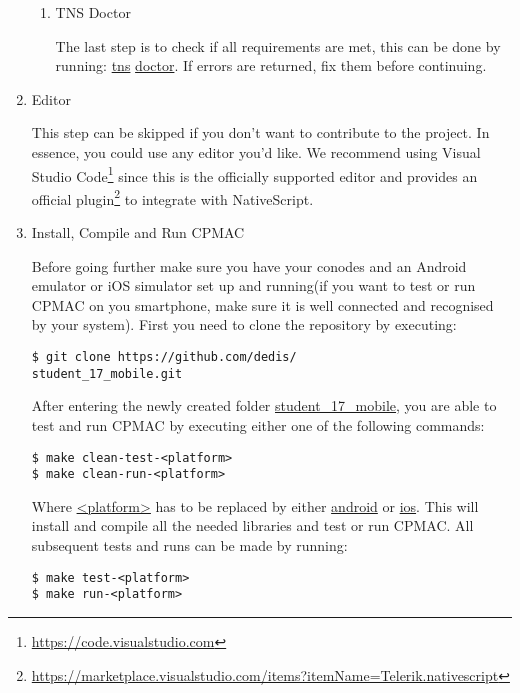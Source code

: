 \begin{enumerate}
\begin{enumerate}
\item TNS Doctor

The last step is to check if all requirements are met, this can be done by running: \url{tns} \url{doctor}. If errors are returned, fix them before continuing.
\end{enumerate}

\item Editor

This step can be skipped if you don't want to contribute to the project. In essence, you could use any editor you'd like. We recommend using Visual Studio Code\footnote{\url{https://code.visualstudio.com}} since this is the officially supported editor and provides an official plugin\footnote{\url{https://marketplace.visualstudio.com/items?itemName=Telerik.nativescript}} to integrate with NativeScript.

\item Install, Compile and Run CPMAC

Before going further make sure you have your conodes and an Android emulator or iOS simulator set up and running(if you want to test or run CPMAC on you smartphone, make sure it is well connected and recognised by your system).
First you need to clone the repository by executing:
\begin{lstlisting}
$ git clone https://github.com/dedis/
student_17_mobile.git
\end{lstlisting}
After entering the newly created folder \url{student_17_mobile}, you are able to test and run CPMAC by executing either one of the following commands:
\begin{lstlisting}
$ make clean-test-<platform>
$ make clean-run-<platform>
\end{lstlisting}
Where \url{<platform>} has to be replaced by either \url{android} or \url{ios}. This will install and compile all the needed libraries and test or run CPMAC. All subsequent tests and runs can be made by running:
\begin{lstlisting}
$ make test-<platform>
$ make run-<platform>
\end{lstlisting}
\end{enumerate}
